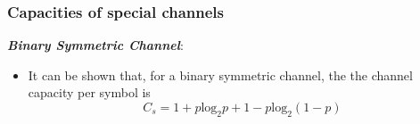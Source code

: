 \documentclass[a4]{beamer}
\begin{document}
\begin{frame}
\frametitle{Capacities of special channels}
\textbf{\emph{Binary Symmetric Channel}}:
\begin{itemize}
\item It can be shown that, for a binary symmetric channel, the the channel capacity per symbol is
\[ C_s = 1 + p\mbox{log}_2p  + 1-p\mbox{log}_2 (1-p)  \]
\end{itemize}
\end{frame}
\end{document}

